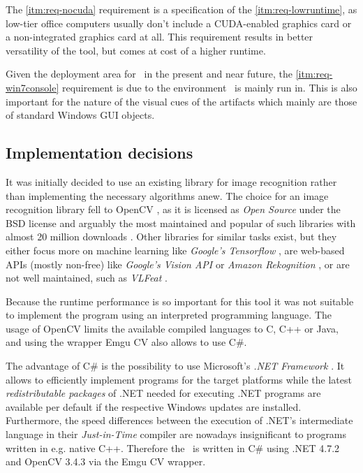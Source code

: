 The \ref{itm:req-nocuda} requirement is a specification of the \ref{itm:req-lowruntime}, as low-tier office computers usually don't include a CUDA-enabled graphics card or a non-integrated graphics card at all. This requirement results in better versatility of the tool, but comes at cost of a higher runtime.

Given the deployment area for \ape~in the present and near future, the \ref{itm:req-win7console} requirement is due to the environment \ape~is mainly run in. This is also important for the nature of the visual cues of the artifacts which mainly are those of standard Windows GUI objects.

\subsection{Implementation decisions}

It was initially decided to use an existing library for image recognition rather than implementing the necessary algorithms anew. The choice for an image recognition library fell to OpenCV \cite{opencv}, as it is licensed as \emph{Open Source} under the BSD license and arguably the most maintained and popular of such libraries with almost 20 million downloads \cite{opencv_downloads}. Other libraries for similar tasks exist, but they either focus more on machine learning like \emph{Google's Tensorflow} \cite{tensorflow}, are web-based APIs (mostly non-free) like \emph{Google's Vision API} \cite{vision_api} or \emph{Amazon Rekognition} \cite{rekognition}, or are not well maintained, such as \emph{VLFeat} \cite{vlfeat}.

Because the runtime performance is so important for this tool it was not suitable to implement the program using an interpreted programming language. The usage of OpenCV limits the available compiled languages to C, C++ or Java, and using the wrapper Emgu CV also allows to use C\#.

The advantage of C\# is the possibility to use Microsoft's \emph{.NET Framework} \cite{dotnet4_7_2}. It allows to efficiently implement programs for the target platforms while the latest \emph{redistributable packages} of .NET needed for executing .NET programs are available per default if the respective Windows updates are installed. Furthermore, the speed differences between the execution of .NET's intermediate language in their \emph{Just-in-Time} compiler are nowadays insignificant to programs written in e.g. native C++. Therefore the \vd~is written in C\# using .NET 4.7.2 and OpenCV 3.4.3 via the Emgu CV wrapper.

